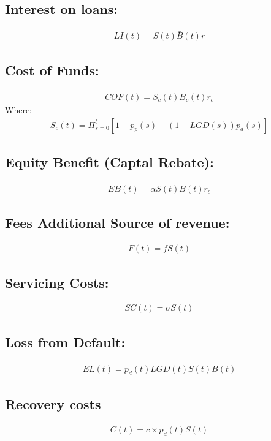 \documentclass[12pt]{book}
\begin{document}
\subsection{ Interest on loans: }
\begin{align}
LI(t) = S(t)\bar{ B}(t)r
\end{align}
\subsection{  Cost of Funds: }
\begin{align}
COF(t) = S_c(t)\bar{ B}_c(t)r_c
\end{align}
Where: 
\begin{align}
S_c(t)= \Pi_{s=0}^t [1- p_p(s)-(1-LGD(s))p_d(s) ]
\end{align}

\subsection{ Equity Benefit (Captal Rebate): }
\begin{align}
EB(t) = \alpha S(t)\bar{ B}(t) r_c
\end{align}

\subsection{ Fees Additional Source of revenue: }
\begin{align}
F(t) = f S(t)
\end{align}

\subsection{ Servicing Costs: }
\begin{align}
SC(t) =  \sigma S(t)
\end{align}

\subsection{ Loss from Default: }
\begin{align}
EL(t) =  p_d(t)LGD(t)S(t)\bar{ B}(t) 
\end{align}
\subsection{Recovery costs}
\begin{align}
C(t) = c\times p_d(t) S(t)
\end{align}
\end{document}
